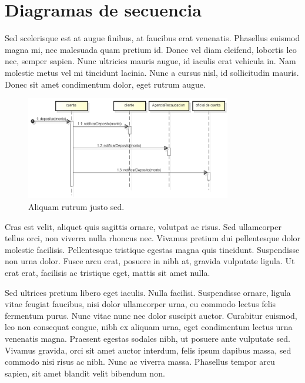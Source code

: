 \documentclass[titlepage,a4paper]{article}
\begin{document}
\section{Diagramas de secuencia}\label{sec:diagramasdesecuencia}

Sed scelerisque est at augue finibus, at faucibus erat venenatis. Phasellus euismod magna mi, nec malesuada quam pretium id. Donec vel diam eleifend, lobortis leo nec, semper sapien. Nunc ultricies mauris augue, id iaculis erat vehicula in. Nam molestie metus vel mi tincidunt lacinia. Nunc a cursus nisl, id sollicitudin mauris. Donec sit amet condimentum dolor, eget rutrum augue.

\begin{figure}[H]
\centering
\includegraphics[width=0.8\textwidth]{diagrama_secuencia01.png}
\caption{\label{fig:seq01}Aliquam rutrum justo sed.}
\end{figure}

Cras est velit, aliquet quis sagittis ornare, volutpat ac risus. Sed ullamcorper tellus orci, non viverra nulla rhoncus nec. Vivamus pretium dui pellentesque dolor molestie facilisis. Pellentesque tristique egestas magna quis tincidunt. Suspendisse non urna dolor. Fusce arcu erat, posuere in nibh at, gravida vulputate ligula. Ut erat erat, facilisis ac tristique eget, mattis sit amet nulla.

Sed ultrices pretium libero eget iaculis. Nulla facilisi. Suspendisse ornare, ligula vitae feugiat faucibus, nisi dolor ullamcorper urna, eu commodo lectus felis fermentum purus. Nunc vitae nunc nec dolor suscipit auctor. Curabitur euismod, leo non consequat congue, nibh ex aliquam urna, eget condimentum lectus urna venenatis magna. Praesent egestas sodales nibh, ut posuere ante vulputate sed. Vivamus gravida, orci sit amet auctor interdum, felis ipsum dapibus massa, sed commodo nisi risus ac nibh. Nunc ac viverra massa. Phasellus tempor arcu sapien, sit amet blandit velit bibendum non.
\end{document}
